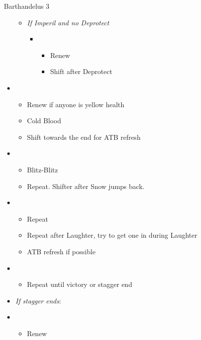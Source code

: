 \begin{battle}{Barthandelus 3}
\begin{multicols}{2}
\begin{itemize}
\begin{itemize}
\begin{itemize}
\begin{itemize}
					                  \end{itemize}
				            \end{itemize}
				      \item \textit{If Imperil and no Deprotect}
				            \begin{itemize}
					            \item \fifth
					                  \begin{itemize}
						                  \item Renew
						                  \item Shift after Deprotect
					                  \end{itemize}
				            \end{itemize}
			      \end{itemize}
			\item \sixth
			      \begin{itemize}
				      \item Renew if anyone is yellow health
				      \item Cold Blood
				      \item Shift towards the end for ATB refresh
			      \end{itemize}
			\item \second
			      \begin{itemize}
				      \item Blitz-Blitz
				      \item Repeat. Shifter after Snow jumps back.
			      \end{itemize}
			\item \first
			      \begin{itemize}
				      \item Repeat
				      \item Repeat after Laughter, try to get one in during Laughter
				      \item ATB refresh if possible
			      \end{itemize}
			\item \second
			      \begin{itemize}
				      \item Repeat until victory or stagger end
			      \end{itemize}
			      \columnbreak
			\item \textit{If stagger ends}:
			\item \third
			      \begin{itemize}
				      \item Renew

\end{itemize}
\end{itemize}
\end{multicols}
\end{battle}
